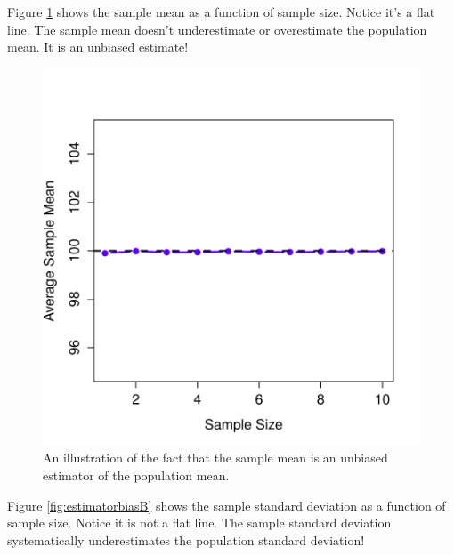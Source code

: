 \documentclass[]{book}
\begin{document}
Figure \ref{fig:estimatorbiasA} shows the sample mean as a function of sample size. Notice it's a flat line. The sample mean doesn't underestimate or overestimate the population mean. It is an unbiased estimate!

\begin{figure}
\centering
\includegraphics{navarro_img/estimation/biasMean-eps-converted-to.pdf}
\caption{\label{fig:estimatorbiasA}An illustration of the fact that the sample mean is an unbiased estimator of the population mean.}
\end{figure}

Figure \ref{fig:estimatorbiasB} shows the sample standard deviation as a function of sample size. Notice it is not a flat line. The sample standard deviation systematically underestimates the population standard deviation!
\end{document}
